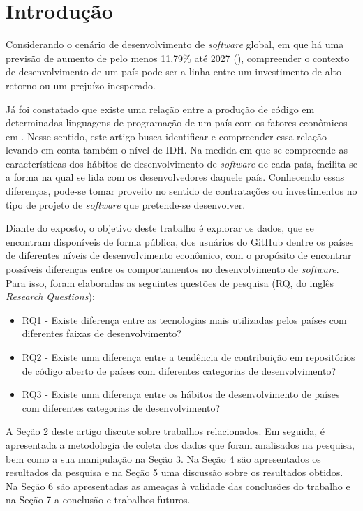 \documentclass[12pt]{article}
\begin{document}
\section{Introdução}

Considerando o cenário de desenvolvimento de \textit{software} global, em que há uma previsão de aumento de pelo menos 11,79\% até 2027 (\cite{MarketShareFuture2019}), compreender o contexto de desenvolvimento de um país pode ser a linha  entre um investimento de alto retorno ou um prejuízo inesperado. 

Já foi constatado que existe uma relação entre a produção de código em determinadas linguagens de programação de um país com os fatores econômicos em \cite{Robinson2017}. Nesse sentido, este artigo busca identificar e compreender essa relação levando em conta também o nível de IDH. Na medida em que se compreende as características dos hábitos de desenvolvimento de \textit{software} de cada país, facilita-se a forma na qual se lida com os desenvolvedores daquele país. Conhecendo essas diferenças, pode-se tomar proveito no sentido de contratações ou investimentos no tipo de projeto de \textit{software} que pretende-se desenvolver.

Diante do exposto, o objetivo deste trabalho é explorar os dados, que se encontram 
disponíveis de forma pública, dos usuários do GitHub dentre os países de diferentes 
níveis de desenvolvimento econômico, com o propósito de encontrar possíveis diferenças
entre os comportamentos no desenvolvimento de \textit{software}. Para isso, foram elaboradas
as seguintes questões de pesquisa (RQ, do inglês \textit{Research Questions}):
\begin{itemize}
    \item RQ1 - Existe diferença entre as tecnologias mais utilizadas pelos países com diferentes faixas de desenvolvimento?
    \item RQ2 - Existe uma diferença entre a tendência de contribuição em repositórios de código aberto de países com diferentes categorias de desenvolvimento?
    \item RQ3 - Existe uma diferença entre os hábitos de desenvolvimento de países com diferentes categorias de desenvolvimento?
\end{itemize}

A Seção 2 deste artigo discute sobre trabalhos relacionados. Em seguida, é 
apresentada a metodologia de coleta dos dados que foram analisados na pesquisa,
bem como a sua manipulação na Seção 3. Na Seção 4 são apresentados os 
resultados da pesquisa e na Seção 5 uma discussão sobre os resultados
obtidos. Na Seção 6 são apresentadas as ameaças 
à validade das conclusões do
trabalho e na Seção 7 a conclusão e trabalhos futuros.
\end{document}
